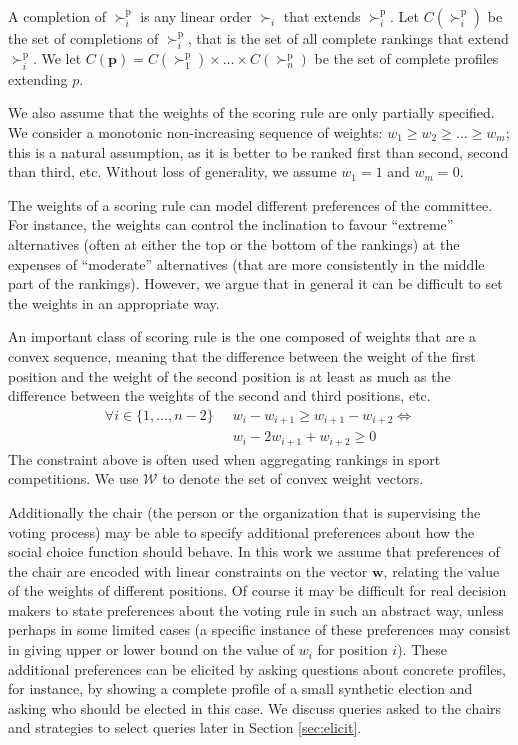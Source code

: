 \documentclass[12pt]{article}
\newcommand{\pref}{\succ}%
\newcommand{\ppref}{\succ^\text{p}}%
\newcommand{\w}{\textbf{w}}%
\begin{document}
A completion of $\ppref_i$ is any linear order $\pref_i$ that extends $\ppref_i$.
Let $C(\ppref_i)$ be the set of completions of $\ppref_i$, that is the set of all complete rankings that extend $\ppref_i$.
We let $C(\textbf{p})=C(\ppref_1)\times \ldots \times C(\ppref_n)$ be the set of complete profiles extending $p$.

\medskip
We also assume that the weights of the scoring rule are only partially specified.
We consider a monotonic non-increasing sequence of weights: $w_{1} \geq w_{2} \geq \ldots \geq w_{m}$; this is a natural assumption, as it is better to be ranked first than second, second than third, etc. 
Without loss of generality, we assume $w_1=1$ and $w_m=0$.

The weights of a scoring rule can model different preferences of the committee. 
For instance, the weights can control the inclination to favour ``extreme'' alternatives (often at either the top or the bottom of the rankings) at the expenses of ``moderate'' alternatives (that are more consistently in the middle part of the rankings).
However, we argue that in general it can be difficult to set the weights in an appropriate way.

An important class of scoring rule is the one composed of weights that are a convex sequence, meaning that the difference between the weight of the first position and the weight of the second position is at least as much as the difference between the weights of the second and third positions, etc.
\begin{align} \forall i \in \{1,\ldots,n-2\} \;\; & w_i - w_{i+1} \geq w_{i+1}-w_{i+2} \iff  \\
& w_i - 2 w_{i+1} + w_{i+2} \geq 0 \label{eq:convexity}
\end{align}
The constraint above is often used when aggregating rankings in sport competitions.
We use $\mathcal{W}$ to denote the set of convex weight vectors.

Additionally the chair (the person or the organization that is supervising the voting process) may be able to specify additional preferences about how the social choice function should behave.
In this work we assume that preferences of the chair are encoded with linear constraints on the vector $\w$, relating the value of the weights of different positions.
Of course it may be difficult for real decision makers to state preferences about the voting rule in such an abstract way, unless perhaps in some limited cases (a specific instance of these preferences may consist in giving upper or lower bound on the value of $w_{i}$ for position $i$).
These additional preferences can be elicited by asking questions about concrete profiles, for instance, by showing a complete profile of a small synthetic election and asking who should be elected in this case.
We discuss queries asked to the chairs and strategies to select queries later in Section \ref{sec:elicit}.
\end{document}
